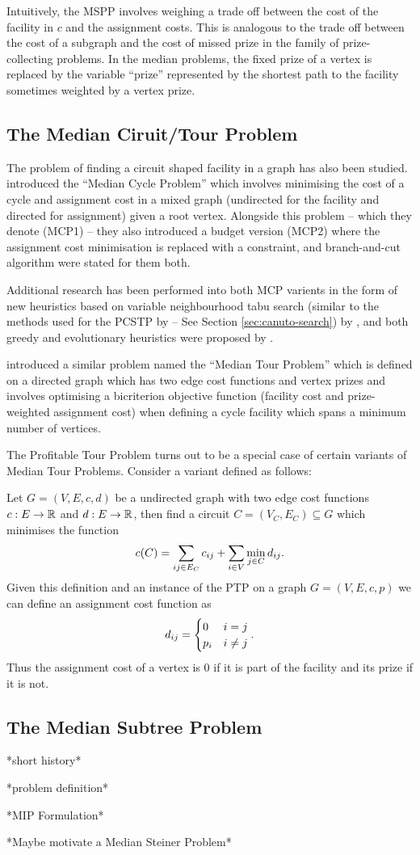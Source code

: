  Intuitively, the MSPP involves weighing a trade off between the cost of the facility
 in $c$ and the assignment costs. 
 This is analogous to the trade off between the cost of a subgraph and the cost of missed prize in the
 family of prize-collecting problems. In the median problems, the fixed prize of a vertex is
 replaced by the variable ``prize'' represented by the shortest path to the facility sometimes weighted
 by a vertex prize.
 \subsection{The Median Ciruit/Tour Problem}
 The problem of finding a circuit shaped facility in a graph has also been studied.
 \citet{labbe1999themedian} introduced the ``Median Cycle Problem'' which involves
 minimising the cost of a cycle and assignment cost in a mixed graph (undirected for
 the facility and directed for assignment) given a root vertex. Alongside this problem
 -- which they denote (MCP1) -- they also introduced a budget version (MCP2) where the
 assignment cost minimisation is replaced with a constraint, and branch-and-cut algorithm
 were stated for them both.

 Additional research has been performed into both MCP varients
 in the form of new heuristics based on variable neighbourhood tabu search
 (similar to the methods used for the PCSTP by \citet{canuto2001local} --
 See Section \ref{sec:canuto-search}) by \citet{perez2003variable}, and both
 greedy and evolutionary heuristics were proposed by \citet{renaud2004efficient}.
 
 \citet{current1994median} introduced a similar problem named the ``Median Tour Problem''
 which is defined on a directed graph which has two edge cost functions and vertex prizes
 and involves optimising a bicriterion objective function
 (facility cost and prize-weighted assignment cost)
 when defining a cycle facility which spans a minimum number of vertices.

 The Profitable Tour Problem turns out to be a special case of certain variants of Median
 Tour Problems. Consider a variant defined as follows:

 Let $G = (V, E, c, d)$ be a undirected graph with two edge cost functions
 $c : E \to \mathbb{R}$ and $d : E \to \mathbb{R}$, then find a circuit $C = (V_C, E_C) \subseteq G$
 which minimises
 the function
 $$c(C) = \sum_{ij \in E_C} c_{ij} + \sum_{i \in V} \min_{j \in C} d_{ij} \mathnormal{.}$$
 Given this definition and an instance of the PTP on a graph $G = (V, E, c, p)$
 we can define an assignment cost function as
 $$d_{ij} =
 \begin{cases}
   0 & i = j \\
   p_i & i \neq j
 \end{cases}\mathnormal{.}
 $$
 Thus the assignment cost of a vertex is 0 if it is part of the facility and its prize
 if it is not.
 \subsection{The Median Subtree Problem}
*short history*

*problem definition*

*MIP Formulation*

*Maybe motivate a Median Steiner Problem*


